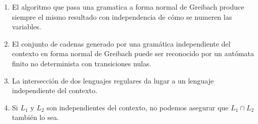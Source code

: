 \begin{enumerate}
    \item El algoritmo que pasa una gramatica a forma normal de Greibach produce siempre el mismo resultado con independencia de cómo se numeren las variables.
    \item El conjunto de cadenas generado por una gramática independiente del contexto en forma normal de Greibach puede ser reconocido por un autómata finito no determinista con transiciones nulas.
    \item La intersección de dos lenguajes regulares da lugar a un lenguaje independiente del contexto.
    \item Si $L_1$ y $L_2$ son independientes del contexto, no podemos asegurar que $L_1 \cap L_2$ también lo sea.
\end{enumerate}

